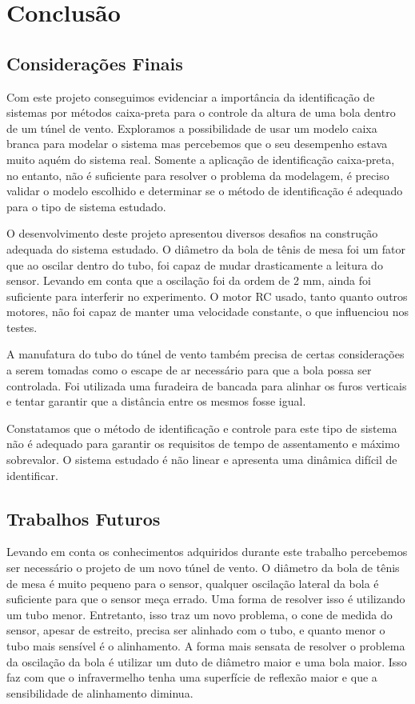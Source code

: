 \chapter{Conclusão} \label{cap7}

\section{Considerações Finais}
Com este projeto conseguimos evidenciar a importância da identificação de sistemas por métodos caixa-preta para o controle da altura de uma bola dentro de um túnel de vento. Exploramos a possibilidade de usar um modelo caixa branca para modelar o sistema mas percebemos que o seu desempenho estava muito aquém do sistema real. Somente a aplicação de identificação caixa-preta, no entanto, não é suficiente para resolver o problema da modelagem, é preciso validar o modelo escolhido e determinar se o método de identificação é adequado para o tipo de sistema estudado.


O desenvolvimento deste projeto apresentou diversos desafios na construção adequada do sistema estudado. O diâmetro da bola de tênis de mesa foi um fator que ao oscilar dentro do tubo, foi capaz de mudar drasticamente a leitura do sensor. Levando em conta que a oscilação foi da ordem de 2 mm, ainda foi suficiente para interferir no experimento. O motor RC usado, tanto quanto outros motores, não foi capaz de manter uma velocidade constante, o que influenciou nos testes.


A manufatura do tubo do túnel de vento também precisa de certas considerações a serem tomadas como o escape de ar necessário para que a bola possa ser controlada. Foi utilizada uma furadeira de bancada para alinhar os furos verticais e tentar garantir que a distância entre os mesmos fosse igual.


Constatamos que o método de identificação e controle para este tipo de sistema não é adequado para garantir os requisitos de tempo de assentamento e máximo sobrevalor. O sistema estudado é não linear e apresenta uma dinâmica difícil de identificar.




\section{Trabalhos Futuros}

Levando em conta os conhecimentos adquiridos durante este trabalho percebemos ser necessário o projeto de um novo túnel de vento. O diâmetro da bola de tênis de mesa é muito pequeno para o sensor, qualquer oscilação lateral da bola é suficiente para que o sensor meça errado. Uma forma de resolver isso é utilizando um tubo menor. Entretanto, isso traz um novo problema, o cone de medida do sensor, apesar de estreito, precisa ser alinhado com o tubo, e quanto menor o tubo mais sensível é o alinhamento. A forma mais sensata de resolver o problema da oscilação da bola é utilizar um duto de diâmetro maior e uma bola maior. Isso faz com que o infravermelho tenha uma superfície de reflexão maior e que a sensibilidade de alinhamento diminua.


